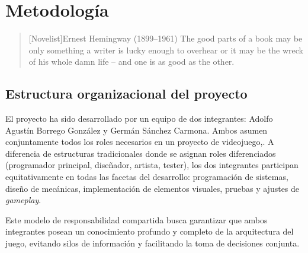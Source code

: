 \chapter{Metodología}

\begin{quotation}[Novelist]{Ernest Hemingway (1899--1961)}
The good parts of a book may be only something a writer is lucky enough to overhear or it may be the wreck of his whole damn life -- and one is as good as the other.
\end{quotation}

\begin{abstract}
En este capítulo se describe el marco de trabajo empleado para el desarrollo de Via Inferni.
Se presenta la estructura organizativa del equipo de dos integrantes sin roles diferenciados, 
donde ambos asumen conjuntamente todas las responsabilidades del proyecto (programación, 
diseño, arte y pruebas). Se explica la metodología ágil adaptada al equipo, basada en Kanban 
y una Definición de Hecho (DoD) consensuada, junto con un flujo de trabajo en control de 
versiones basado en Trunk-Based Development simplificado con ramas de integración de corta 
duración. Este enfoque prioriza el desarrollo conjunto del núcleo del juego para garantizar 
conocimiento compartido, seguido de la implementación paralela de contenido adicional una vez 
establecida una base arquitectónica sólida.
\end{abstract}

\section{Estructura organizacional del proyecto}

El proyecto ha sido desarrollado por un equipo de dos integrantes: Adolfo Agustín Borrego González 
y Germán Sánchez Carmona. Ambos asumen conjuntamente todos los roles necesarios en un proyecto de 
videojuego,. A diferencia de estructuras tradicionales donde se asignan roles diferenciados 
(programador principal, diseñador, artista, tester), los dos integrantes participan 
equitativamente en todas las facetas del desarrollo: programación de sistemas, 
diseño de mecánicas, implementación de elementos visuales, pruebas y ajustes de \textit{gameplay}.

Este modelo de responsabilidad compartida busca garantizar que ambos integrantes posean un 
conocimiento profundo y completo de la arquitectura del juego, evitando silos de información 
y facilitando la toma de decisiones conjunta.

